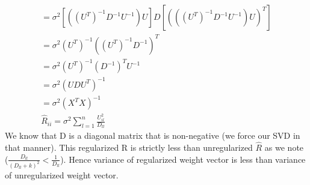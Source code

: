 \documentclass[a4paper]{article}
\begin{document}
\begin{enumerate}
\begin{enumerate}
\begin{gather*}
		= \sigma^2 [((U^T)^{-1} D^{-1} U^{-1}) U]D[ (((U^T)^{-1} D^{-1} U^{-1}) U)^T ]\\
		= \sigma^2 (U^T)^{-1} ((U^T)^{-1}D^{-1})^T\\
		= \sigma^2 (U^T)^{-1} (D^{-1})^T U^{-1}\\
		= \sigma^2 (UDU^T)^{-1}\\
		= \sigma^2 (X^TX)^{-1}\\
		\hat{R}_{ii} = \sigma^2 \sum_{l=1}^n \frac{U_{il}^2}{D_{ll}}
	\end{gather*}
	We know that D is a diagonal matrix that is non-negative (we force our SVD in that manner). This regularized R is strictly less than unregularized $\hat{R}$ as we note ($\frac{D_{ll}}{(D_{ll} + k)^2} < \frac{1}{D_{ll}}$). Hence variance of regularized weight vector is less than variance of unregularized weight vector.
	\end{enumerate}
\end{enumerate}
\end{document}
